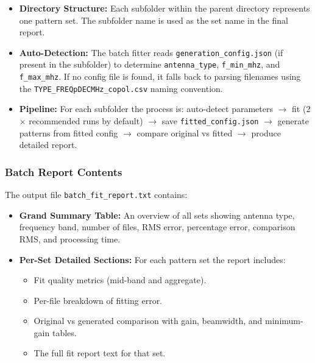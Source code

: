 \documentclass[11pt,a4paper]{article}
\begin{document}
\begin{itemize}
    \item \textbf{Directory Structure:} Each subfolder within the parent directory represents one pattern set. The subfolder name is used as the set name in the final report.
    \item \textbf{Auto-Detection:} The batch fitter reads \texttt{generation\_config.json} (if present in the subfolder) to determine \texttt{antenna\_type}, \texttt{f\_min\_mhz}, and \texttt{f\_max\_mhz}. If no config file is found, it falls back to parsing filenames using the \texttt{TYPE\_FREQpDECMHz\_copol.csv} naming convention.
    \item \textbf{Pipeline:} For each subfolder the process is: auto-detect parameters $\rightarrow$ fit (2$\times$ recommended runs by default) $\rightarrow$ save \texttt{fitted\_config.json} $\rightarrow$ generate patterns from fitted config $\rightarrow$ compare original vs fitted $\rightarrow$ produce detailed report.
\end{itemize}

\subsubsection*{Batch Report Contents}
The output file \texttt{batch\_fit\_report.txt} contains:
\begin{itemize}
    \item \textbf{Grand Summary Table:} An overview of all sets showing antenna type, frequency band, number of files, RMS error, percentage error, comparison RMS, and processing time.
    \item \textbf{Per-Set Detailed Sections:} For each pattern set the report includes:
    \begin{itemize}
        \item Fit quality metrics (mid-band and aggregate).
        \item Per-file breakdown of fitting error.
        \item Original vs generated comparison with gain, beamwidth, and minimum-gain tables.
        \item The full fit report text for that set.
    \end{itemize}
\end{itemize}
\end{document}

